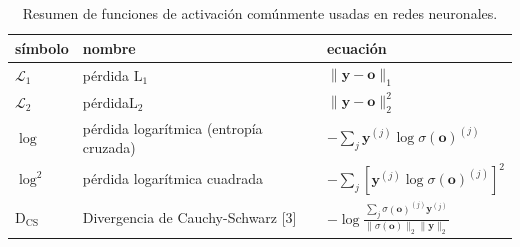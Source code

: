 \begin{table}[htbp]
    \centering
    \caption{Resumen de funciones de activación comúnmente usadas en redes neuronales.}
    \label{tab:funciones_de_activacion}
    \begin{tabular}{lll}
        \toprule
        símbolo & nombre & ecuación \\
        \midrule
        $\mathcal{L}_1$ & pérdida $\mathrm{L}_1$  & $\|\mathbf{y} - \mathbf{o}\|_1$ \\
        $\mathcal{L}_2$ & pérdida$\mathrm{L}_2$  & $\|\mathbf{y} - \mathbf{o}\|_2^2$ \\
        $\log$ & pérdida logarítmica (entropía cruzada)  & $-\sum_j \mathbf{y}^{(j)} \log \sigma(\mathbf{o})^{(j)}$ \\
        $\log^2$ & pérdida logarítmica cuadrada & $-\sum_j [\mathbf{y}^{(j)} \log \sigma(\mathbf{o})^{(j)}]^2$ \\
        $\text{D}_{\text{CS}}$ & Divergencia de Cauchy-Schwarz [3] & $\displaystyle -\log \frac{\sum_j \sigma(\mathbf{o})^{(j)}\mathbf{y}^{(j)}}{\|\sigma(\mathbf{o})\|_2 \|\mathbf{y}\|_2}$ \\
        \bottomrule
    \end{tabular}
\end{table}

